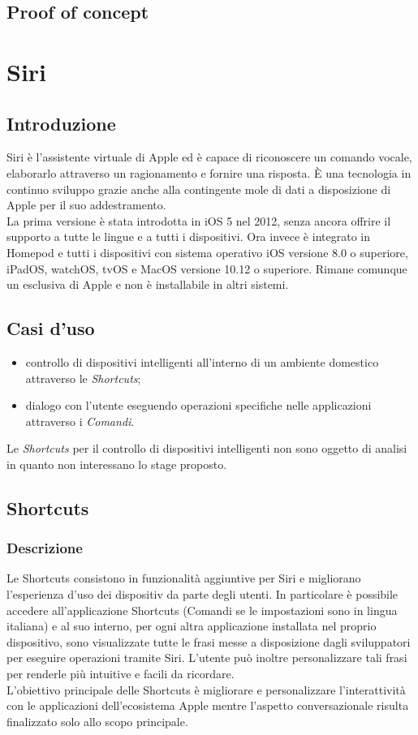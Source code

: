 	\subsection{Proof of concept}

\section{Siri}
	\subsection{Introduzione}
	Siri è l'assistente virtuale di Apple ed è capace di riconoscere un comando vocale, elaborarlo attraverso un ragionamento e fornire una risposta. È una tecnologia in continuo sviluppo grazie anche alla contingente mole di dati a disposizione di Apple per il suo addestramento. \\
	La prima versione è stata introdotta in iOS 5 nel 2012, senza ancora offrire il supporto a tutte le lingue e a tutti i dispositivi. Ora invece è integrato in Homepod e tutti i dispositivi con sistema operativo iOS versione 8.0 o superiore, iPadOS, watchOS, tvOS e MacOS versione 10.12 o superiore. Rimane comunque un esclusiva di Apple e non è installabile in altri sistemi.
	\subsection{Casi d'uso}
	\begin{itemize}
		\item controllo di dispositivi intelligenti all'interno di un ambiente domestico attraverso le \textit{Shortcuts};
		\item dialogo con l'utente eseguendo operazioni specifiche nelle applicazioni attraverso i \textit{Comandi}.
	\end{itemize}
	Le \textit{Shortcuts} per il controllo di dispositivi intelligenti non sono oggetto di analisi in quanto non interessano lo stage proposto.
	\subsection{Shortcuts}
		\subsubsection{Descrizione}
		Le Shortcuts consistono in funzionalità aggiuntive per Siri e migliorano l'esperienza d'uso dei dispositiv da parte degli utenti. In particolare è possibile accedere all'applicazione Shortcuts (Comandi se le impostazioni sono in lingua italiana) e al suo interno, per ogni altra applicazione installata nel proprio dispositivo, sono visualizzate tutte le frasi messe a disposizione dagli sviluppatori per eseguire operazioni tramite Siri. L'utente può inoltre personalizzare tali frasi per renderle più intuitive e facili da ricordare. \\
		L'obiettivo principale delle Shortcuts è migliorare e personalizzare l'interattività con le applicazioni dell'ecosistema Apple mentre l'aspetto conversazionale risulta finalizzato solo allo scopo principale.
